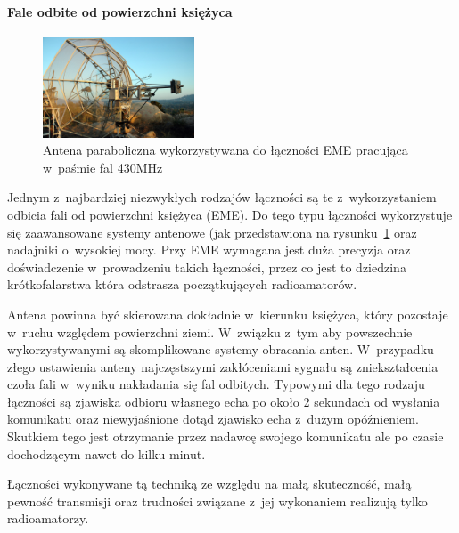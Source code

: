\documentclass[eng,oneside]{mgr}
\begin{document}
					\paragraph{Fale odbite od powierzchni księżyca}
					\begin{figure}
						\vspace{-20pt}
						\begin{center}
							\includegraphics[width=0.4\textwidth]{eme_antenna}
						\end{center}
						\vspace{-20pt}
						\caption{Antena paraboliczna wykorzystywana do łączności EME pracująca w~paśmie fal 430MHz}
						\vspace{-10pt}
						\label{fig:eme_antenna}
					\end{figure}
					Jednym z~najbardziej niezwykłych rodzajów łączności są te z~wykorzystaniem odbicia fali od powierzchni księżyca (EME). Do tego typu łączności wykorzystuje się zaawansowane systemy antenowe (jak przedstawiona na rysunku~\ref{fig:eme_antenna} oraz nadajniki o~wysokiej mocy. Przy EME wymagana jest duża precyzja oraz doświadczenie w~prowadzeniu takich łączności, przez co jest to dziedzina krótkofalarstwa która odstrasza początkujących radioamatorów. 


					Antena powinna być skierowana dokładnie w~kierunku księżyca, który pozostaje w~ruchu względem powierzchni ziemi. W~związku z~tym aby powszechnie wykorzystywanymi są skomplikowane systemy obracania anten. W~przypadku złego ustawienia anteny najczęstszymi zakłóceniami sygnału są zniekształcenia czoła fali w~wyniku nakładania się fal odbitych. Typowymi dla tego rodzaju łączności są zjawiska odbioru własnego echa po około 2 sekundach od wysłania komunikatu oraz niewyjaśnione dotąd zjawisko echa z~dużym opóźnieniem. Skutkiem tego jest otrzymanie przez nadawcę swojego komunikatu ale po czasie dochodzącym nawet do kilku minut.

					Łączności wykonywane tą techniką ze względu na małą skuteczność, małą pewność transmisji oraz trudności związane z~jej wykonaniem realizują tylko radioamatorzy.
\end{document}
